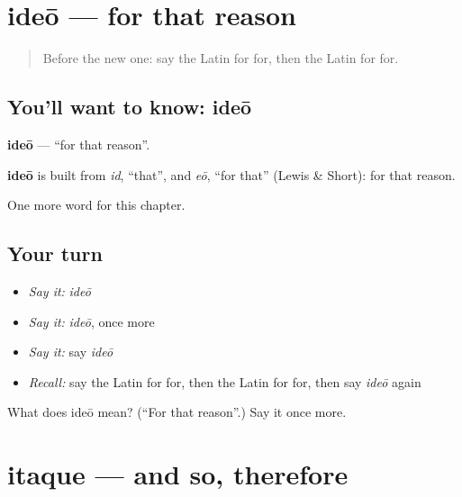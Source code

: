 \section[ideō]{ideō — for that reason}

\label{lesson:LA-C113-ideo}



\begin{quote}
Before the new one: say the Latin for for, then the Latin for for.
\end{quote}

\subsection*{You'll want to know: ideō}
\textbf{ideō} — \textquotedblleft{}for that reason\textquotedblright{}.

\begin{cousinweb}
\textbf{ideō} is built from \emph{id}, \textquotedblleft{}that\textquotedblright{}, and \emph{eō}, \textquotedblleft{}for that\textquotedblright{} (Lewis \& Short): for that reason.
\end{cousinweb}

\begin{grammarlens}[title={What you've built}]
One more word for this chapter.
\end{grammarlens}

\subsection*{Your turn}
\begin{itemize}
\raggedright
  \item \emph{Say it:} \emph{ideō}
  \item \emph{Say it:} \emph{ideō}, once more
  \item \emph{Say it:} say \emph{ideō}
  \item \emph{Recall:} say the Latin for for, then the Latin for for, then say \emph{ideō} again
\end{itemize}

\begin{tcolorbox}[breakable,colback=teal!4,colframe=teal!35!black,title={Before you move on}]
What does ideō mean? (\textquotedblleft{}For that reason\textquotedblright{}.) Say it once more.
\end{tcolorbox}
\section[itaque]{itaque — and so, therefore}

